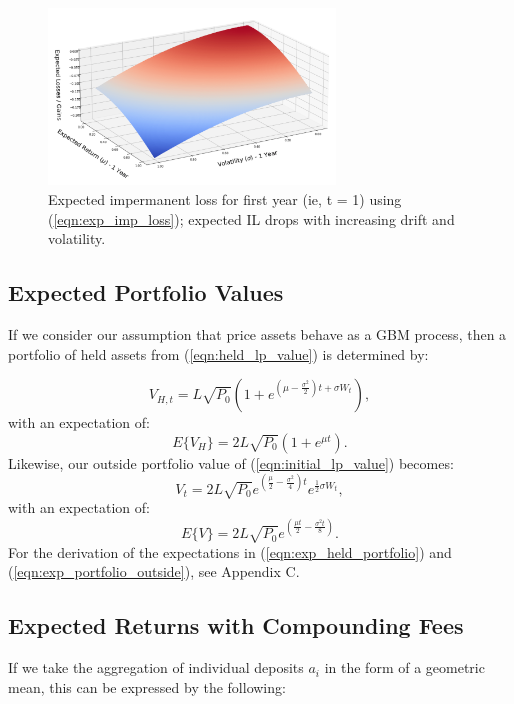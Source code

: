 \documentclass[journal,twocolumn,12pt]{ieeesyscoin}
\begin{document}
\begin{figure}[h!]
\includegraphics[width=3in]{img/imp_loss.png}
\caption{Expected impermanent loss for first year (ie, t = 1) using (\ref{eqn:exp_imp_loss}); expected IL drops with increasing drift and volatility.} 
\label{fig:exp_imp_loss}
\end{figure}

\subsection{Expected Portfolio Values}
\label{sec:exp_portfolio_value}
If we consider our assumption that price assets behave as a GBM process, then a portfolio of held assets from (\ref{eqn:held_lp_value}) is determined by:

\begin{equation}\label{eqn:held_portfolio}
  V_{H,t} = L \sqrt{P_{0}}(1 + e^{(\mu - \frac{\sigma^2}{2})t + \sigma W_{t} }),
\end{equation}
with an expectation of:
\begin{equation}\label{eqn:exp_held_portfolio}
  E\{V_{H}\} = 2 L \sqrt{P_{0}} (1 + e^{\mu t}).
\end{equation}
Likewise, our outside portfolio value of (\ref{eqn:initial_lp_value}) becomes:
\begin{equation}\label{eqn:portfolio_outside}
  V_{t} = 2L \sqrt{P_{0}} e^{(\frac{\mu}{2} - \frac{\sigma^2}{4})t } e^{   \frac{1}{2}\sigma W_{t}}, 
\end{equation}
with an expectation of:
\begin{equation}\label{eqn:exp_portfolio_outside}
  E\{V\} = 2 L \sqrt{P_{0}}  e^{(\frac{\mu t}{2} - \frac{\sigma^2 t}{8})}.
\end{equation}
For the derivation of the expectations in (\ref{eqn:exp_held_portfolio}) and (\ref{eqn:exp_portfolio_outside}), see Appendix C.

\subsection{Expected Returns with Compounding Fees}
\label{sec:exp_lp_returns}
If we take the aggregation of individual deposits $a_{i}$ in the form of a geometric mean, this can be expressed by the following:
\end{document}

